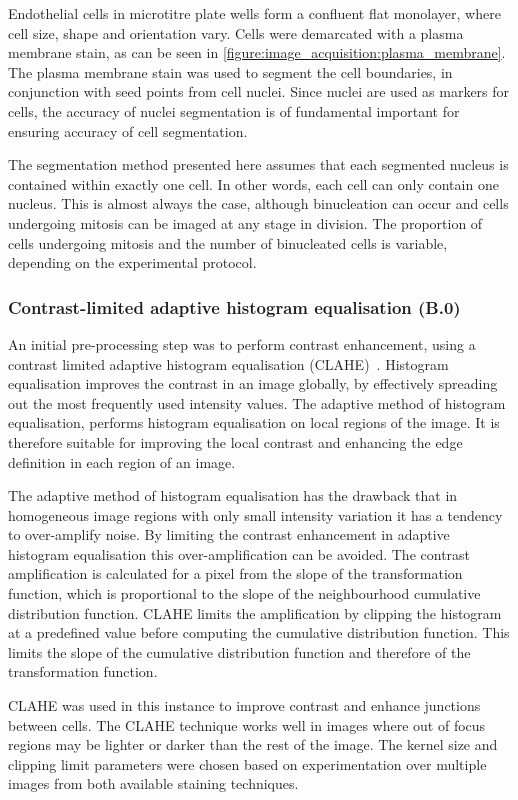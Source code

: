 Endothelial cells in microtitre plate wells form a confluent flat monolayer, where cell size, shape and orientation vary. Cells were demarcated with a plasma membrane stain, as can be seen in \autoref{figure:image_acquisition:plasma_membrane}. The plasma membrane stain was used to segment the cell boundaries, in conjunction with seed points from cell nuclei. Since nuclei are used as markers for cells, the accuracy of nuclei segmentation is of fundamental important for ensuring accuracy of cell segmentation.

The segmentation method presented here assumes that each segmented nucleus is contained within exactly one cell. In other words, each cell can only contain one nucleus. This is almost always the case, although binucleation can occur and cells undergoing mitosis can be imaged at any stage in division. The proportion of cells undergoing mitosis and the number of binucleated cells is variable, depending on the experimental protocol.

\subsubsection{Contrast-limited adaptive histogram equalisation (B.0)}
An initial pre-processing step was to perform contrast enhancement, using a contrast limited adaptive histogram equalisation (CLAHE)~\cite{Ketcham1974}. Histogram equalisation improves the contrast in an image globally, by effectively spreading out the most frequently used intensity values. The adaptive method of histogram equalisation, performs histogram equalisation on local regions of the image. It is therefore suitable for improving the local contrast and enhancing the edge definition in each region of an image.

The adaptive method of histogram equalisation has the drawback that in homogeneous image regions with only small intensity variation it has a tendency to over-amplify noise. By limiting the contrast enhancement in adaptive histogram equalisation this over-amplification can be avoided. The contrast amplification is calculated for a pixel from the slope of the transformation function, which is proportional to the slope of the neighbourhood cumulative distribution function. CLAHE limits the amplification by clipping the histogram at a predefined value before computing the cumulative distribution function. This limits the slope of the cumulative distribution function and therefore of the transformation function.

CLAHE was used in this instance to improve contrast and enhance junctions between cells. The CLAHE technique works well in images where out of focus regions may be lighter or darker than the rest of the image. The kernel size and clipping limit parameters were chosen based on experimentation over multiple images from both available staining techniques.

